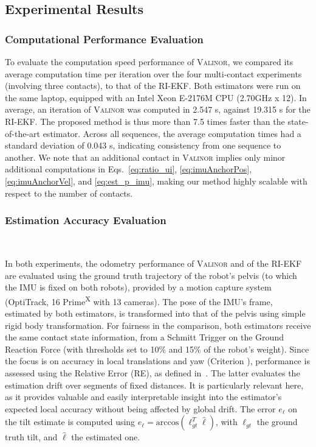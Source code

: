 \documentclass{IJCAS}
\newcommand{\critnum}[1]{\tikz[baseline=(char.base)]{
            \node[shape=circle,draw,inner sep=1pt](char){\textbf{#1}};}}
\begin{document}
\subsection{Experimental Results}

\subsubsection{Computational Performance Evaluation}\label{subsec:computation_time}

To evaluate the computation speed performance of {\scshape Valinor}, we compared its average computation time per iteration over the four multi-contact experiments (involving three contacts), to that of the RI-EKF. Both estimators were run on the same laptop, equipped with an Intel Xeon E-2176M CPU (2.70GHz x 12). In average, an iteration of {\scshape Valinor} was computed in 2.547 \textmu s, against 19.315 \textmu s for the RI-EKF. The proposed method is thus more than 7.5 times faster than the state-of-the-art estimator. Across all sequences, the average computation times had a standard deviation of 0.043 \textmu s, indicating consistency from one sequence to another. We note that an additional contact in {\scshape Valinor} implies only minor additional computations in Eqs.~\eqref{eq:ratio_ui}, \eqref{eq:imuAnchorPos},\eqref{eq:imuAnchorVel}, and \eqref{eq:est_p_imu}, making our method highly scalable with respect to the number of contacts.


\subsubsection{Estimation Accuracy Evaluation} ~\label{subsec:est_accur_eval}


In both experiments, the odometry performance of {\scshape Valinor} and of the RI-EKF are evaluated using the ground truth trajectory of the robot's pelvis (to which the IMU is fixed on both robots), provided by a motion capture system (OptiTrack, 16 Prime\textsuperscript{X} with 13 cameras). The pose of the IMU's frame, estimated by both estimators, is transformed into that of the pelvis using simple rigid body transformation. For fairness in the comparison, both estimators receive the same contact state information, from a Schmitt Trigger on the Ground Reaction Force (with thresholds set to 10\% and 15\% of the robot's weight).
Since the focus is on accuracy in local translations and yaw (Criterion \critnum{3}), performance is assessed using the Relative Error (RE), as defined in~\cite{Zhang2018QuantitativeTrajectoryEvaluation}. The latter evaluates the estimation drift over segments of fixed distances. It is particularly relevant here, as it provides valuable and easily interpretable insight into the estimator's expected local accuracy without being affected by global drift. The error $e_{\boldsymbol{\ell}}$ on the tilt estimate is computed using $e_{\boldsymbol{\ell}} = \text{arccos}\left(\boldsymbol{\ell}_{gt}^{T} \hat{\boldsymbol{\ell}} \right)$, with $\boldsymbol{\ell}_{gt}$ the ground truth tilt, and $\hat{\boldsymbol{\ell}}$ the estimated one. 
\end{document}
